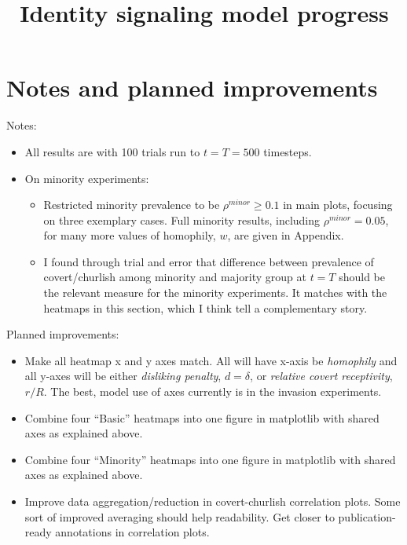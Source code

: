 \documentclass[11pt,letterpaper]{article}
\title{\vspace{-1in}Identity signaling model progress}
\author{} %
\begin{document}
\maketitle
\tableofcontents

\section{Notes and planned improvements}

Notes:
\begin{itemize}
  \item All results are with 100 trials run to $t=T=500$ timesteps.
  \item On minority experiments:
    \begin{itemize}
      \item Restricted minority prevalence to be $\rho^{minor}\geq0.1$ in main plots, focusing
        on three exemplary cases. Full minority results, including $\rho^{minor}=0.05$,
        for many more values of homophily, $w$, are given in Appendix.
      \item I found through trial and error that difference between prevalence of 
        covert/churlish among minority and majority group at $t=T$ should be the
        relevant measure for the minority experiments. It matches with the
        heatmaps in this section, which I think tell a complementary story.
    \end{itemize}
\end{itemize}

Planned improvements:
\begin{itemize}
  \item Make all heatmap x and y axes match. All will have x-axis be 
    \emph{homophily} and all y-axes will be either \emph{disliking penalty},
    $d=\delta$, or \emph{relative covert receptivity}, $r/R$. 
    The best, model use of axes currently is in the invasion experiments.
  \item Combine four ``Basic'' heatmaps into one figure in matplotlib with 
    shared axes as explained above.
  \item Combine four ``Minority'' heatmaps into one figure in matplotlib with 
    shared axes as explained above.
  \item Improve data aggregation/reduction in covert-churlish correlation
    plots. Some sort of improved averaging should help readability. Get 
    closer to publication-ready annotations in correlation plots.
\end{itemize}
\end{document}
